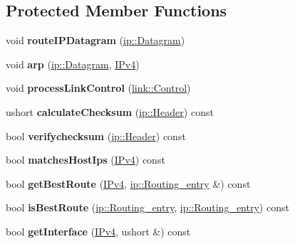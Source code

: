 \subsection*{Protected Member Functions}
\begin{DoxyCompactItemize}
\item 
void {\bfseries route\+I\+P\+Datagram} (\hyperlink{structip_1_1Datagram}{ip\+::\+Datagram})\hypertarget{classip__protocol_ae49db3617f34c1765b8b3f64996fe7eb}{}\label{classip__protocol_ae49db3617f34c1765b8b3f64996fe7eb}

\item 
void {\bfseries arp} (\hyperlink{structip_1_1Datagram}{ip\+::\+Datagram}, \hyperlink{structIPv4}{I\+Pv4})\hypertarget{classip__protocol_a32a4c86b4f32594b60a3f7170421fb7e}{}\label{classip__protocol_a32a4c86b4f32594b60a3f7170421fb7e}

\item 
void {\bfseries process\+Link\+Control} (\hyperlink{structlink_1_1Control}{link\+::\+Control})\hypertarget{classip__protocol_a6c03ee07d8fa8c2b4a5f43732fb95c05}{}\label{classip__protocol_a6c03ee07d8fa8c2b4a5f43732fb95c05}

\item 
ushort {\bfseries calculate\+Checksum} (\hyperlink{structip_1_1Header}{ip\+::\+Header}) const \hypertarget{classip__protocol_a14d8f57ecf3e4e7b8c2fc5b98a782939}{}\label{classip__protocol_a14d8f57ecf3e4e7b8c2fc5b98a782939}

\item 
bool {\bfseries verifychecksum} (\hyperlink{structip_1_1Header}{ip\+::\+Header}) const \hypertarget{classip__protocol_aa730a2a5c453742c1a3bcc105bc839c0}{}\label{classip__protocol_aa730a2a5c453742c1a3bcc105bc839c0}

\item 
bool {\bfseries matches\+Host\+Ips} (\hyperlink{structIPv4}{I\+Pv4}) const \hypertarget{classip__protocol_ac83406e9e5d5e54b1a3afd4d5a4f53c9}{}\label{classip__protocol_ac83406e9e5d5e54b1a3afd4d5a4f53c9}

\item 
bool {\bfseries get\+Best\+Route} (\hyperlink{structIPv4}{I\+Pv4}, \hyperlink{structip_1_1Routing__entry}{ip\+::\+Routing\+\_\+entry} \&) const \hypertarget{classip__protocol_a391caec68e7eaf86659f0479763500ec}{}\label{classip__protocol_a391caec68e7eaf86659f0479763500ec}

\item 
bool {\bfseries is\+Best\+Route} (\hyperlink{structip_1_1Routing__entry}{ip\+::\+Routing\+\_\+entry}, \hyperlink{structip_1_1Routing__entry}{ip\+::\+Routing\+\_\+entry}) const \hypertarget{classip__protocol_a49ccaaab6a679045ddbff00f44ca49cc}{}\label{classip__protocol_a49ccaaab6a679045ddbff00f44ca49cc}

\item 
bool {\bfseries get\+Interface} (\hyperlink{structIPv4}{I\+Pv4}, ushort \&) const \hypertarget{classip__protocol_a15e87109b4478fe5028e3e67c11a20fb}{}\label{classip__protocol_a15e87109b4478fe5028e3e67c11a20fb}

\end{DoxyCompactItemize}
